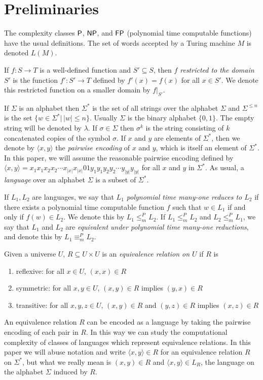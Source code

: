 \documentclass[draft]{article}
\theoremstyle{definition} \newtheorem{openproblem}[openproblem]{Open problem}
\theoremstyle{definition} \newtheorem{definition}[definition]{Definition}
\theoremstyle{remark} \newtheorem{remark}[remark]{Remark}
\newcommand{\mor}{\leq^{P}_{m}} %
\newcommand{\moe}{\equiv^{P}_{m}} %
\newcommand{\defn}[1]{\emph{#1}} %
\newcommand{\pair}[2]{\langle#1,#2\rangle} %
\begin{document}
\section{Preliminaries}

The complexity classes $\P$, $\NP$, and $\FP$ (polynomial time computable functions) have the usual definitions.
The set of words accepted by a Turing machine $M$ is denoted $L(M)$.

If $f\colon S\to T$ is a well-defined function and $S'\subseteq S$, then \defn{$f$ restricted to the domain $S'$} is the function $f'\colon S'\to T$ defined by $f'(x)=f(x)$ for all $x\in S'$.
We denote this restricted function on a smaller domain by $f|_{S'}$.

If $\Sigma$ is an alphabet then $\Sigma^*$ is the set of all strings over the alphabet $\Sigma$ and $\Sigma^{\leq n}$ is the set $\{w\in\Sigma^*|\,|w|\leq n\}$.
Usually $\Sigma$ is the binary alphabet $\{0, 1\}$.
The empty string will be denoted by $\lambda$.
If $\sigma\in\Sigma$ then $\sigma^k$ is the string consisting of $k$ concatenated copies of the symbol $\sigma$.
If $x$ and $y$ are elements of $\Sigma^*$, then we denote by $\pair{x}{y}$ the \defn{pairwise encoding} of $x$ and $y$, which is itself an element of $\Sigma^*$.
In this paper, we will assume the reasonable pairwise encoding defined by $\pair{x}{y}=x_1x_1x_2x_2\cdots x_{|x|}x_{|x|}01y_1y_1y_2y_2\cdots y_{|y|}y_{|y|}$ for all $x$ and $y$ in $\Sigma^*$.
As usual, a \defn{language} over an alphabet $\Sigma$ is a subset of $\Sigma^*$.

If $L_1, L_2$ are languages, we say that \defn{$L_1$ polynomial time many-one reduces to $L_2$} if there exists a polynomial time computable function $f$ such that $w\in L_1$ if and only if $f(w)\in L_2$.
We denote this by $L_1\mor L_2$.
If $L_1\mor L_2$ and $L_2\mor L_1$, we say that $L_1$ and $L_2$ are \defn{equivalent under polynomial time many-one reductions}, and denote this by $L_1\moe L_2$.

Given a universe $U$, $R\subseteq U\times U$ is an \defn{equivalence relation on $U$} if $R$ is
\begin{enumerate}
\item reflexive: for all $x\in U$, $(x,x)\in R$
\item symmetric: for all $x,y\in U$, $(x,y)\in R$ implies $(y,x)\in R$
\item transitive: for all $x,y,z\in U$, $(x,y)\in R$ and $(y,z)\in R$ implies $(x,z)\in R$
\end{enumerate}
An equivalence relation $R$ can be encoded as a language by taking the pairwise encoding of each pair in $R$.
In this way we can study the computational complexity of classes of languages which represent equivalence relations.
In this paper we will abuse notation and write $\pair{x}{y}\in R$ for an equivalence relation $R$ on $\Sigma^*$, but what we really mean is $(x,y)\in R$ and $\pair{x}{y}\in L_R$, the language on the alphabet $\Sigma$ induced by $R$.
\end{document}
